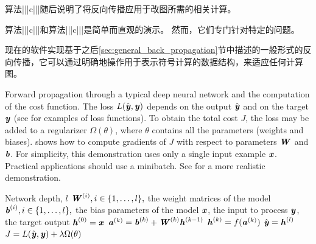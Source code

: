 算法|||c|||随后说明了将反向传播应用于改图所需的相关计算。

算法|||c|||和算法|||c|||是简单而直观的演示。
然而，它们专门针对特定的问题。

现在的软件实现基于之后\ref{sec:general_back_propagation}节中描述的一般形式的反向传播，它可以通过明确地操作用于表示符号计算的数据结构，来适应任何计算图。

\begin{algorithm}[ht]
\caption{Forward propagation through a typical deep neural network
and the computation of the cost function.
The loss $L(\hat{\boldsymbol{\mathit{y}}},\boldsymbol{\mathit{y}})$ depends on the
output $\hat{\boldsymbol{\mathit{y}}}$ and on the target $\boldsymbol{\mathit{y}}$ (see  for examples of
loss functions). To obtain the total cost $J$,
the loss may be added to a regularizer $\Omega(\theta)$, where $\theta$
contains all the parameters (weights and biases).  shows
how to compute gradients of $J$ with respect to parameters $\boldsymbol{\mathit{W}}$ and $\boldsymbol{\mathit{b}}$. 
For simplicity, this demonstration uses only a single input example $\boldsymbol{\mathit{x}}$.
Practical applications should use a minibatch. See 
for a more realistic demonstration.
}
\label{alg:mlp-fprop}
\begin{algorithmic}
\REQUIRE Network depth, $l$
\REQUIRE $\boldsymbol{\mathit{W}}^{(i)}, i \in \{ 1, \dots, l\},$ the weight matrices of the model
\REQUIRE $\boldsymbol{\mathit{b}}^{(i)}, i \in \{ 1, \dots, l\},$ the bias parameters of the model
\REQUIRE $\boldsymbol{\mathit{x}}$, the input to process
\REQUIRE $\boldsymbol{\mathit{y}}$, the target output
\STATE $\boldsymbol{\mathit{h}}^{(0)}=\boldsymbol{\mathit{x}}$
 \STATE $\boldsymbol{\mathit{a}}^{(k)} = \boldsymbol{\mathit{b}}^{(k)} + \boldsymbol{\mathit{W}}^{(k)} \boldsymbol{\mathit{h}}^{(k-1)}$
 \STATE $\boldsymbol{\mathit{h}}^{(k)} = f(\boldsymbol{\mathit{a}}^{(k)})$
\ENDFOR
\STATE $\hat{\boldsymbol{\mathit{y}}} = \boldsymbol{\mathit{h}}^{(l)}$
\STATE $J = L(\hat{\boldsymbol{\mathit{y}}},\boldsymbol{\mathit{y}}) + \lambda \Omega(\theta)$
\end{algorithmic}
\end{algorithm}


